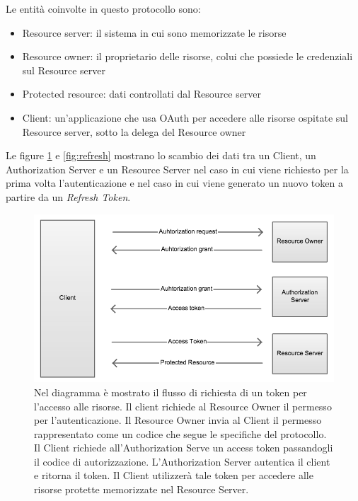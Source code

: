 Le entità coinvolte in questo protocollo sono:



\begin{itemize}
  \item Resource server: il sistema in cui sono memorizzate le risorse
  \item Resource owner: il proprietario delle risorse, colui che possiede le credenziali sul Resource server
  \item Protected resource: dati controllati dal Resource server
  \item Client: un’applicazione che usa OAuth per accedere alle risorse ospitate sul Resource server, sotto la delega del Resource owner
\end{itemize}



Le figure \ref{fig:oauth} e \ref{fig:refresh} mostrano lo scambio dei dati tra un Client, un Authorization Server e un Resource Server nel caso in cui viene richiesto per la prima volta l'autenticazione e nel caso in cui viene generato un nuovo token a partire da un \emph{Refresh Token}.

\begin{figure}[!htbp]
\centering
\includegraphics[scale=0.50]{architettura/token.png}
\caption{Nel diagramma è mostrato il flusso di richiesta di un token per l'accesso alle risorse. Il client richiede al Resource Owner il permesso per l'autenticazione. Il Resource Owner invia al Client il permesso rappresentato come un codice che segue le specifiche del protocollo. Il Client richiede all'Authorization Serve un access token passandogli il codice di autorizzazione. L'Authorization Server autentica il client e ritorna il token. Il Client utilizzerà tale token per accedere alle risorse protette memorizzate nel Resource Server. }
\label{fig:oauth}
\end{figure}


